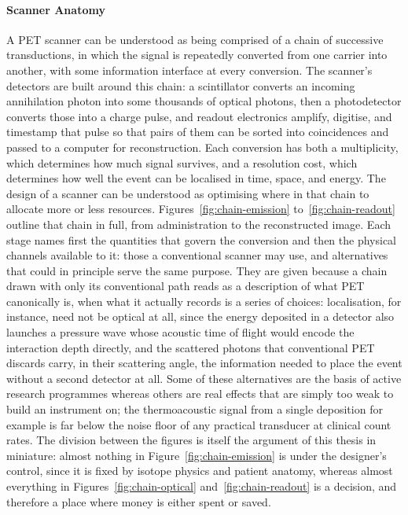 \paragraph{Scanner Anatomy}
A PET scanner can be understood as being comprised of a chain of successive transductions, in which the signal is repeatedly converted from one carrier into another, with some information interface at every conversion.
The scanner's detectors are built around this chain: a scintillator converts an incoming annihilation photon into some thousands of optical photons, then a photodetector converts those into a charge pulse, and readout electronics amplify, digitise, and timestamp that pulse so that pairs of them can be sorted into coincidences and passed to a computer for reconstruction.
Each conversion has both a multiplicity, which determines how much signal survives, and a resolution cost, which determines how well the event can be localised in time, space, and energy.
The design of a scanner can be understood as optimising where in that chain to allocate more or less resources.
Figures~\ref{fig:chain-emission} to~\ref{fig:chain-readout} outline that chain in full, from administration to the reconstructed image.
Each stage names first the quantities that govern the conversion and then the physical channels available to it: those a conventional scanner may use, and alternatives that could in principle serve the same purpose.
They are given because a chain drawn with only its conventional path reads as a description of what PET canonically is, when what it actually records is a series of choices: localisation, for instance, need not be optical at all, since the energy deposited in a detector also launches a pressure wave whose acoustic time of flight would encode the interaction depth directly, and the scattered photons that conventional PET discards carry, in their scattering angle, the information needed to place the event without a second detector at all.
Some of these alternatives are the basis of active research programmes whereas others are real effects that are simply too weak to build an instrument on; the thermoacoustic signal from a single  deposition for example is far below the noise floor of any practical transducer at clinical count rates.
The division between the figures is itself the argument of this thesis in miniature: almost nothing in Figure~\ref{fig:chain-emission} is under the designer's control, since it is fixed by isotope physics and patient anatomy, whereas almost everything in Figures~\ref{fig:chain-optical} and~\ref{fig:chain-readout} is a decision, and therefore a place where money is either spent or saved.

